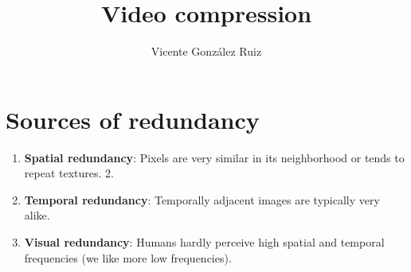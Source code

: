 
\title{Video compression}

\author{Vicente González Ruiz}

\maketitle

\section{Sources of redundancy}
\begin{enumerate}
\item
  \textbf{Spatial redundancy}: Pixels are very similar in its
  neighborhood or tends to repeat textures. 2.
\item
  \textbf{Temporal redundancy}: Temporally adjacent images are typically
  very alike.
\item
  \textbf{Visual redundancy}: Humans hardly perceive high
  spatial and temporal frequencies (we like more low frequencies).
\end{enumerate}

